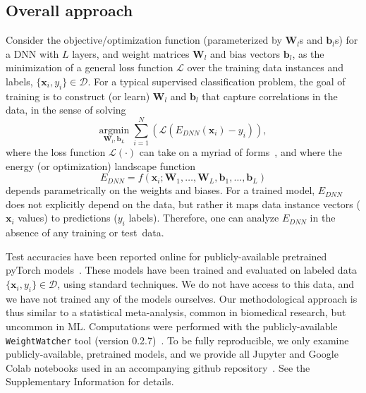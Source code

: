 \subsection{Overall approach}
\label{sxn:approach}


Consider the objective/optimization function (parameterized by $\mathbf{W}_{l}$s and $\mathbf{b}_{l}$s) for a DNN with $L$ layers, and weight matrices $\mathbf{W}_{l}$ and bias vectors $\mathbf{b}_{l}$, as 
the minimization of a general loss function $\mathcal{L}$ over the training data instances and labels, $\{\mathbf{x}_{i},y_{i}\}\in\mathcal{D}$.
For a typical supervised classification problem, the goal of training is to construct (or learn) $\mathbf{W}_{l}$ and $\mathbf{b}_{l}$ that capture correlations in the data, in the sense of solving
\begin{equation}
\underset{\mathbf{W}_{l},\mathbf{b}_{L}}{\text{argmin}}\;\sum_{i=1}^{N}\left(\mathcal{L}(E_{DNN}(\mathbf{x}_{i})-y_{i})\right)  ,
\end{equation}
where the loss function $\mathcal{L}(\cdot)$ can take on a myriad of forms~\cite{JC17_TR}, and where the energy (or optimization) landscape function
\begin{equation}
E_{DNN} = f(\mathbf{x}_{i} ; \mathbf{W}_{1},\ldots,\mathbf{W}_{L},\mathbf{b}_{1},\ldots,\mathbf{b}_{L})
\label{eqn:dnn_energy}
\end{equation}
depends parametrically on the weights and biases.
For a trained model, $E_{DNN}$ does not explicitly depend on the data, but rather it maps data instance vectors ($\mathbf{x}_i$ values) to predictions ($y_{i}$ labels).
Therefore, one can analyze $E_{DNN}$ in the absence of any training or test~data. 

Test accuracies have been reported online for publicly-available pretrained pyTorch models~\cite{osmr}.
These models have been trained and evaluated on labeled data $\{\mathbf{x}_{i},y_{i}\}\in\mathcal{D}$, using standard techniques.  
We do not have access to this data, and we have not trained any of the models ourselves. 
Our methodological approach is thus similar to a statistical meta-analysis, common in biomedical research, but uncommon in ML.
%
Computations were performed with the publicly-available \texttt{WeightWatcher} tool (version 0.2.7)~\cite{weightwatcher_package}.
To be fully reproducible, we only examine publicly-available, pretrained models, and we provide all Jupyter and Google Colab notebooks used in an accompanying github repository~\cite{kdd20_sub_repo}.
See the Supplementary Information
for details.


